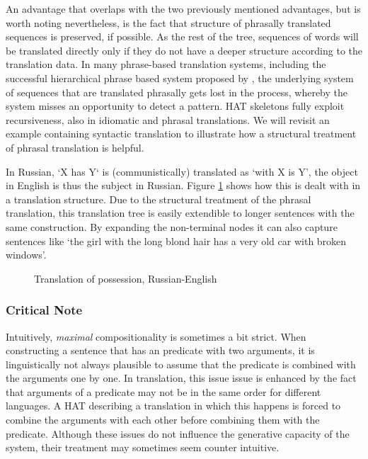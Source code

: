 \documentclass{report}
\begin{document}
An advantage that overlaps with the two previously mentioned advantages, but is worth noting nevertheless, is the fact that structure of phrasally translated sequences is preserved, if possible. As the rest of the tree, sequences of words will be translated directly only if they do not have a deeper structure according to the translation data. In many phrase-based translation systems, including the successful hierarchical phrase based system proposed by \cite{chiang2007hierarchical}, the underlying system of sequences that are translated phrasally gets lost in the process, whereby the system misses an opportunity to detect a pattern. HAT skeletons fully exploit recursiveness, also in idiomatic and phrasal translations. We will revisit an example containing syntactic translation to illustrate how a structural treatment of phrasal translation is helpful.

In Russian, `X has Y` is (communistically) translated as `with X is Y', the object in English is thus the subject in Russian. Figure \ref{fig:russian} shows how this is dealt with in a translation structure. Due to the structural treatment of the phrasal translation, this translation tree is easily extendible to longer sentences with the same construction. By expanding the non-terminal nodes it can also capture sentences like `the girl with the long blond hair has a very old car with broken windows'.

\begin{figure}[!ht]
\centering

\caption{Translation of possession, Russian-English}\label{fig:russian}
\end{figure}


\subsubsection{Critical Note}

Intuitively, \textit{maximal} compositionality is sometimes a bit strict. When constructing a sentence that has an predicate with two arguments, it is linguistically not always plausible to assume that the predicate is combined with the arguments one by one. In translation, this issue issue is enhanced by the fact that arguments of a predicate may not be in the same order for different languages. A HAT describing a translation in which this happens is forced to combine the arguments with each other before combining them with the predicate. Although these issues do not influence the generative capacity of the system, their treatment may sometimes seem counter intuitive.
\end{document}
